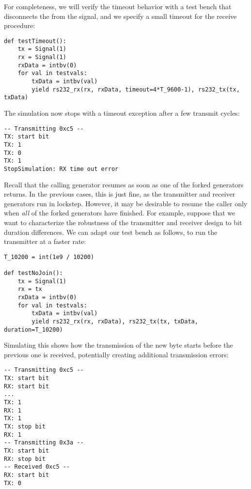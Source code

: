 For completeness, we will verify the timeout behavior with a test
bench that disconnects the  from the  signal, and we
specify a small timeout for the receive procedure:

\begin{verbatim}
def testTimeout():
    tx = Signal(1)
    rx = Signal(1)
    rxData = intbv(0)
    for val in testvals:
        txData = intbv(val)
        yield rs232_rx(rx, rxData, timeout=4*T_9600-1), rs232_tx(tx, txData)

\end{verbatim}
 
The simulation now stops with a timeout exception after a few
transmit cycles:

\begin{verbatim}
-- Transmitting 0xc5 --
TX: start bit
TX: 1
TX: 0
TX: 1
StopSimulation: RX time out error

\end{verbatim}

Recall that the calling generator resumes as soon as one of the
forked generators returns. In the previous cases, this is just fine,
as the transmitter and receiver generators run in lockstep. However,
it may be desirable to resume the caller only when \emph{all} of the
forked generators have finished. For example, suppose that we want to
characterize the robustness of the transmitter and receiver design to
bit duration differences. We can adapt our test bench as follows, to
run the transmitter at a faster rate:

\begin{verbatim}
T_10200 = int(1e9 / 10200)

def testNoJoin():
    tx = Signal(1)
    rx = tx
    rxData = intbv(0)
    for val in testvals:
        txData = intbv(val)
        yield rs232_rx(rx, rxData), rs232_tx(tx, txData, duration=T_10200)

\end{verbatim}

Simulating this shows how the transmission of the new byte starts
before the previous one is received, potentially creating additional
transmission errors:

\begin{verbatim}
-- Transmitting 0xc5 --
TX: start bit
RX: start bit
...
TX: 1
RX: 1
TX: 1
TX: stop bit
RX: 1
-- Transmitting 0x3a --
TX: start bit
RX: stop bit
-- Received 0xc5 --
RX: start bit
TX: 0

\end{verbatim}

